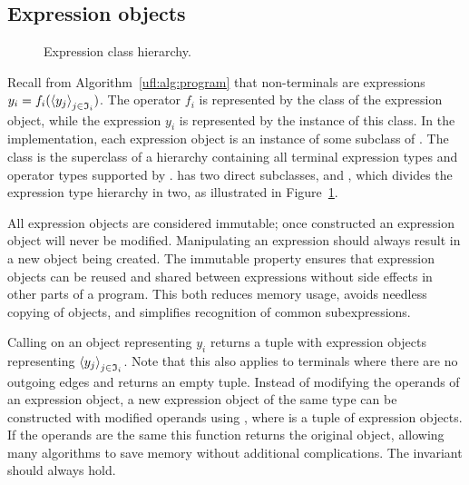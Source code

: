 \subsection{Expression objects}

\begin{figure}
  \caption{Expression class hierarchy.}
  \label{ufl:fig:expr}
\end{figure}

Recall from Algorithm~\ref{ufl:alg:program} that non-terminals are
expressions $y_i = f_i(\left<y_j\right>_{j\in\mathfrak{I}_i})$.  The operator
$f_i$ is represented by the class of the expression object, while
the expression $y_i$ is represented by the instance of this class.
In the \ufl{} implementation, each expression object is an instance of
some subclass of . The class  is the superclass of
a hierarchy containing all terminal expression types and operator types
supported by \ufl{}.  has two direct subclasses, 
and , which divides the expression type hierarchy in two,
as illustrated in Figure~\ref{ufl:fig:expr}.

All expression objects are considered immutable; once constructed an
expression object will never be modified.  Manipulating an expression
should always result in a new object being created.  The immutable
property ensures that expression objects can be reused and shared
between expressions without side effects in other parts of a program.
This both reduces memory usage, avoids needless copying of objects,
and simplifies recognition of common subexpressions.

Calling  on an  object  representing
$y_i$ returns a tuple with expression objects representing
$\left<y_j\right>_{j\in\mathfrak{I}_i}$.  Note that this also applies to
terminals where there are no outgoing edges and 
returns an empty tuple.  Instead of modifying the operands of an
expression object, a new expression object of the same type can be
constructed with modified operands using ,
where  is a tuple of expression objects. If the operands
are the same this function returns the original object, allowing many
algorithms to save memory without additional complications. The invariant
 should always hold.


